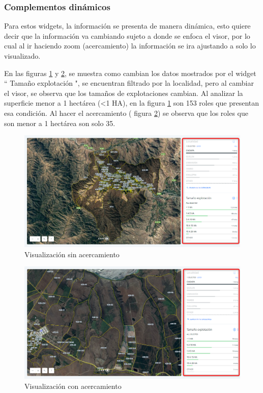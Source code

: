 \documentclass[10pt]{article}
\begin{document}
\subsubsection{Complementos dinámicos}

Para estos widgets, la información se presenta de manera dinámica, esto quiere decir que la información va cambiando sujeto a donde se enfoca el visor, por lo cual al ir haciendo zoom (acercamiento) la información se ira ajustando a solo  lo visualizado.\bigskip\setlength{\parindent}{0pt}

En las figuras \ref{14} y \ref{15}, se muestra como cambian los datos mostrados por el widget “ Tamaño explotación ", se encuentran filtrado por la localidad, pero al cambiar el visor, se observa que los tamaños de explotaciones cambian. Al analizar la superficie menor a 1 hectárea (<1 HA), en la figura \ref{14} son 153 roles que presentan esa condición. Al hacer el acercamiento ( figura \ref{15}) se observa que los roles que son menor a 1 hectárea son solo 35.

\begin{figure}[H]
\centering
\includegraphics[scale=0.4]{Figuras_manual/tam_explot111.png}
\caption{Visualización sin acercamiento}
\label{14}
\end{figure}

\begin{figure}[H]
\centering
\includegraphics[scale=0.4]{Figuras_manual/tam_explot2.png}
\caption{Visualización con acercamiento}
\label{15}
\end{figure}
\end{document}
